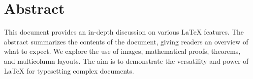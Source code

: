 \section*{Abstract}

This document provides an in-depth discussion on various LaTeX features. The abstract summarizes the contents of the document, giving readers an overview of what to expect. We explore the use of images, mathematical proofs, theorems, and multicolumn layouts. The aim is to demonstrate the versatility and power of LaTeX for typesetting complex documents.
